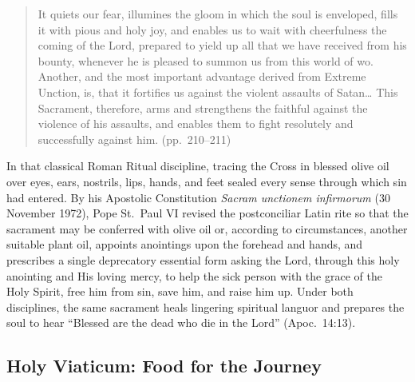\begin{quote}
It quiets our fear, illumines the gloom in which the soul is enveloped, fills it with pious and holy joy, and enables us to wait with cheerfulness the coming of the Lord, prepared to yield up all that we have received from his bounty, whenever he is pleased to summon us from this world of wo. Another, and the most important advantage derived from Extreme Unction, is, that it fortifies us against the violent assaults of Satan\ldots{} This Sacrament, therefore, arms and strengthens the faithful against the violence of his assaults, and enables them to fight resolutely and successfully against him. (pp.\ 210--211)
\end{quote}

In that classical Roman Ritual discipline, tracing the Cross in blessed olive oil over eyes, ears, nostrils, lips, hands, and feet sealed every sense through which sin had entered. By his Apostolic Constitution \emph{Sacram unctionem infirmorum} (30 November 1972), Pope St.\ Paul VI revised the postconciliar Latin rite so that the sacrament may be conferred with olive oil or, according to circumstances, another suitable plant oil, appoints anointings upon the forehead and hands, and prescribes a single deprecatory essential form asking the Lord, through this holy anointing and His loving mercy, to help the sick person with the grace of the Holy Spirit, free him from sin, save him, and raise him up. Under both disciplines, the same sacrament heals lingering spiritual languor and prepares the soul to hear ``Blessed are the dead who die in the Lord'' (Apoc.\ 14:13).

\subsection{Holy Viaticum: Food for the Journey}


